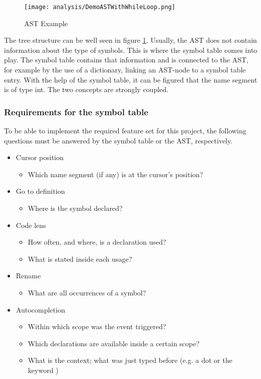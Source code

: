 \begin{figure}[h]
    \centering
    \texttt{[image: analysis/DemoASTWithWhileLoop.png]}
    \caption{AST Example}
    \label{fig:ast_for_example}
\end{figure}

The tree structure can be well seen in figure \ref{fig:ast_for_example}.
Usually, the AST does not contain information about the type of symbols.
This is where the symbol table comes into play.
The symbol table contains that information and is connected to the AST, for example by the use of a dictionary, linking an AST-node to a symbol table entry.
With the help of the symbol table, it can be figured that the name segment  is of type int.
The two concepts are strongly coupled.

\subsubsection{Requirements for the symbol table}
To be able to implement the required feature set for this project, the following questions must be answered by the symbol table or the AST, respectively.
\begin{itemize}
    \item Cursor position
    \begin{itemize}
        \item Which name segment (if any) is at the cursor's position?
    \end{itemize}

    \item Go to definition
        \begin{itemize}
            \item Where is the symbol declared?
        \end{itemize}

    \item Code lens
        \begin{itemize}
            \item How often, and where, is a declaration used?
            \item What is stated inside each usage?
        \end{itemize}

    \item Rename
        \begin{itemize}
            \item What are all occurrences of a symbol?
        \end{itemize}

    \item Autocompletion
        \begin{itemize}
            \item Within which scope was the event triggered?
            \item Which declarations are available inside a certain scope?
            \item What is the context; what was just typed before (e.g. a dot or the keyword )
        \end{itemize}
\end{itemize}


